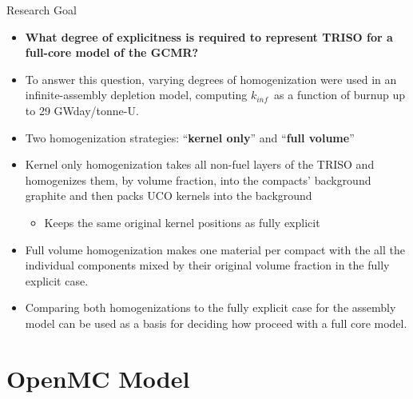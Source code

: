 \documentclass[9pt,t,aspectratio=169]{beamer}
\newcommand{\kinf}{$k_{inf}$}
\begin{document}
\begin{frame}{Research Goal}
    \begin{itemize}
        \item \textbf{What degree of explicitness is required to represent TRISO for a full-core model of the GCMR?}
        \item To answer this question, varying degrees of homogenization were used in an infinite-assembly depletion model, computing \kinf~as a function of burnup up to 29 GWday/tonne-U.
        \item Two homogenization strategies: ``\textbf{kernel only}'' and ``\textbf{full volume}''
        \item Kernel only homogenization takes all non-fuel layers of the TRISO and homogenizes them, by volume fraction, into the compacts' background graphite and then packs UCO kernels into the background
        \begin{itemize}
            \item Keeps the same original kernel positions as fully explicit
        \end{itemize}
        \item Full volume homogenization makes one material per compact with the all the individual components mixed by their original volume fraction in the fully explicit case.
        \item Comparing both homogenizations to the fully explicit case for the assembly model can be used as a basis for deciding how proceed with a full core model.
    \end{itemize}
\end{frame}

\section{OpenMC Model}
\end{document}
